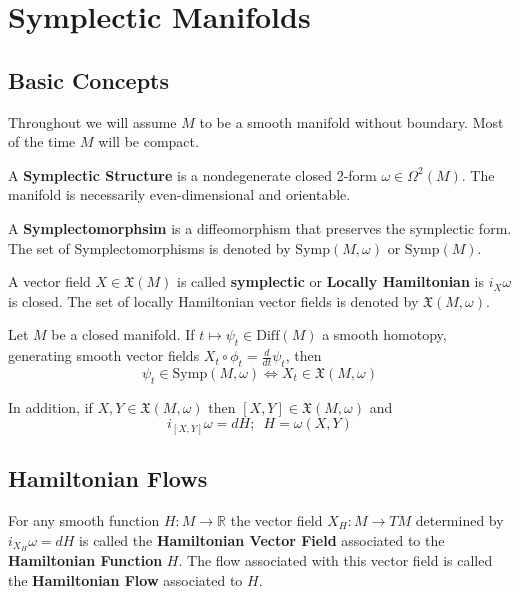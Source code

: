 
\section{Symplectic Manifolds}
\subsection{Basic Concepts}
\indent Throughout we will assume $M$ to be a smooth manifold without boundary. Most of the time $M$ will be compact. \\
\begin{defn}
A \textbf{Symplectic Structure} is a nondegenerate closed 2-form $\omega \in \Omega^2(M)$. The manifold is necessarily even-dimensional and orientable.
\end{defn}

\begin{defn}
A \textbf{Symplectomorphsim} is a diffeomorphism that preserves the symplectic form. The set of Symplectomorphisms is denoted by $\mathrm{Symp}(M,\omega)$ or $\mathrm{Symp}(M)$.
\end{defn}

\begin{defn}
A vector field $X\in \mathfrak{X}(M)$ is called \textbf{symplectic} or \textbf{Locally Hamiltonian} is $i_X\omega$ is closed. The set of locally Hamiltonian vector fields is denoted by $\mathfrak{X}(M,\omega)$.
\end{defn}

\begin{prop}
Let $M$ be a closed manifold. If $t \mapsto \psi_t \in \mathrm{Diff}(M)$ a smooth homotopy, generating smooth vector fields $X_t \circ \phi_t = \frac{d}{dt}\psi_t$, then 
\begin{equation}
    \psi_t \in \mathrm{Symp}(M,\omega) \iff X_t \in \mathfrak{X}(M,\omega)
\end{equation}

In addition, if $X,Y \in \mathfrak{X}(M,\omega)$ then $[X,Y] \in \mathfrak{X}(M,\omega)$ and 
\begin{equation}
    i_{[X,Y]}\omega = dH; \hspace{6pt} H=\omega(X,Y)
\end{equation}
\end{prop}

\subsection{Hamiltonian Flows}

\begin{defn}
For any smooth function $H:M \to \mathbb{R}$ the vector field $X_H:M \to TM$ determined by $i_{X_H}\omega=dH$ is called the \textbf{Hamiltonian Vector Field} associated to the \textbf{Hamiltonian Function} $H$. The flow associated with this vector field is called the \textbf{Hamiltonian Flow} associated to $H$.
\end{defn}

